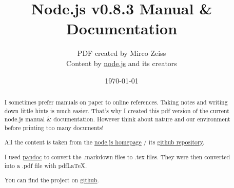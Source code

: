 \documentclass[10pt, a4paper, titlepage, oneside, plain]{article}
\begin{document}
	\title{Node.js v0.8.3 Manual \& Documentation}
	\author{PDF created by Mirco Zeiss\\Content by \href{http://www.nodejs.org}{node.js} and its creators}
	\date{\today}

	\maketitle

	\begin{abstract}
	I sometimes prefer manuals on paper to online references. Taking notes and writing down little hints is much easier. That's why I created this pdf version of the current node.js manual \& documentation. However think about nature and our environment before printing too many documents!

	All the content is taken from the \href{http://www.nodejs.org}{node.js homepage} / its \href{https://github.com/joyent/node}{github repository}.

	I used \href{http://johnmacfarlane.net/pandoc/}{pandoc} to convert the .markdown files to .tex files. They were then converted into a .pdf file with pdfLaTeX.

	You can find the project on \href{https://github.com/zeMirco/nodejs-pdf-docs}{github}.
	\end{abstract}

	\tableofcontents

	
	
	
	
	
	
	
	
	
	
	
	
	
	
				
	
					
	
	
	
	
	
	
	
	
	
\end{document}
